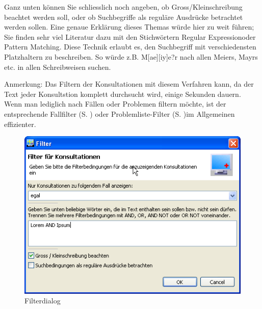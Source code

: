 Ganz unten können Sie schliesslich noch angeben, ob Gross/Kleinschreibung
beachtet werden soll, oder ob Suchbegriffe als reguläre Ausdrücke betrachtet
werden sollen. Eine genaue Erklärung dieses Themas würde hier zu weit führen;
Sie finden sehr viel Literatur dazu mit den Stichwörtern \glqq Regular
Expression\grqq{}oder \glqq Pattern Matching\grqq{}. Diese Technik erlaubt es,
den Suchbegriff mit verschiedensten Platzhaltern zu beschreiben. So würde z.B.
\glqq M[ae][iy]e?r\grqq{} nach allen Meiers, Mayrs etc. in allen Schreibweisen
suchen.

\medskip

Anmerkung:
Das Filtern der Konsultationen mit diesem Verfahren kann, da der Text jeder Konsultstion komplett durchsucht wird, einige Sekunden dauern. Wenn man lediglich nach Fällen oder Problemen filtern möchte, ist der entsprechende Fallfilter (S. \pageref{filter:fall}) oder Problemliste-Filter (S. \pageref{filter:problemliste})im Allgemeinen effizienter.

\begin{figure}[ht]
\begin{center}
  \includegraphics{images/filterdialog}
  \caption{Filterdialog}
  \label{fig:konsfilter}
\end{center}
\end{figure}


